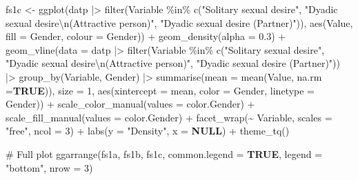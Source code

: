 \documentclass[
  bookmarksnumbered]{article}
\newenvironment{Shaded}{\begin{snugshade}}{\end{snugshade}}
\newcommand{\AttributeTok}[1]{\textcolor[rgb]{0.80,0.80,0.80}{#1}}
\newcommand{\CommentTok}[1]{\textcolor[rgb]{0.50,0.62,0.50}{#1}}
\newcommand{\ConstantTok}[1]{\textcolor[rgb]{0.86,0.64,0.64}{\textbf{#1}}}
\newcommand{\DecValTok}[1]{\textcolor[rgb]{0.86,0.86,0.80}{#1}}
\newcommand{\FloatTok}[1]{\textcolor[rgb]{0.75,0.75,0.82}{#1}}
\newcommand{\FunctionTok}[1]{\textcolor[rgb]{0.94,0.94,0.56}{#1}}
\newcommand{\NormalTok}[1]{\textcolor[rgb]{0.80,0.80,0.80}{#1}}
\newcommand{\OtherTok}[1]{\textcolor[rgb]{0.94,0.94,0.56}{#1}}
\newcommand{\SpecialCharTok}[1]{\textcolor[rgb]{0.86,0.64,0.64}{#1}}
\newcommand{\StringTok}[1]{\textcolor[rgb]{0.80,0.58,0.58}{#1}}
\begin{document}
\begin{Shaded}
\begin{Highlighting}[]
\NormalTok{fs1c }\OtherTok{\textless{}{-}} \FunctionTok{ggplot}\NormalTok{(datp }\SpecialCharTok{|\textgreater{}}
                 \FunctionTok{filter}\NormalTok{(Variable }\SpecialCharTok{\%in\%} \FunctionTok{c}\NormalTok{(}\StringTok{"Solitary sexual desire"}\NormalTok{,}
                                        \StringTok{"Dyadic sexual desire}\SpecialCharTok{\textbackslash{}n}\StringTok{(Attractive person)"}\NormalTok{,}
                                        \StringTok{"Dyadic sexual desire (Partner)"}\NormalTok{)),}
             \FunctionTok{aes}\NormalTok{(Value,}
                 \AttributeTok{fill =}\NormalTok{ Gender,}
                 \AttributeTok{colour =}\NormalTok{ Gender)) }\SpecialCharTok{+}
        \FunctionTok{geom\_density}\NormalTok{(}\AttributeTok{alpha =} \FloatTok{0.3}\NormalTok{) }\SpecialCharTok{+}
        \FunctionTok{geom\_vline}\NormalTok{(}\AttributeTok{data =}\NormalTok{ datp }\SpecialCharTok{|\textgreater{}}
                     \FunctionTok{filter}\NormalTok{(Variable }\SpecialCharTok{\%in\%} \FunctionTok{c}\NormalTok{(}\StringTok{"Solitary sexual desire"}\NormalTok{,}
                                            \StringTok{"Dyadic sexual desire}\SpecialCharTok{\textbackslash{}n}\StringTok{(Attractive person)"}\NormalTok{,}
                                            \StringTok{"Dyadic sexual desire (Partner)"}\NormalTok{)) }\SpecialCharTok{|\textgreater{}} 
                     \FunctionTok{group\_by}\NormalTok{(Variable, Gender) }\SpecialCharTok{|\textgreater{}}
                     \FunctionTok{summarise}\NormalTok{(}\AttributeTok{mean =} \FunctionTok{mean}\NormalTok{(Value, }\AttributeTok{na.rm =}\ConstantTok{TRUE}\NormalTok{)),}
                   \AttributeTok{size =} \DecValTok{1}\NormalTok{,}
                   \FunctionTok{aes}\NormalTok{(}\AttributeTok{xintercept =}\NormalTok{ mean, }\AttributeTok{color =}\NormalTok{ Gender, }\AttributeTok{linetype =}\NormalTok{ Gender)) }\SpecialCharTok{+}
        \FunctionTok{scale\_color\_manual}\NormalTok{(}\AttributeTok{values =}\NormalTok{ color.Gender) }\SpecialCharTok{+}
        \FunctionTok{scale\_fill\_manual}\NormalTok{(}\AttributeTok{values =}\NormalTok{ color.Gender) }\SpecialCharTok{+}
        \FunctionTok{facet\_wrap}\NormalTok{(}\SpecialCharTok{\textasciitilde{}}\NormalTok{ Variable,}
                   \AttributeTok{scales =} \StringTok{"free"}\NormalTok{,}
                   \AttributeTok{ncol =} \DecValTok{3}\NormalTok{) }\SpecialCharTok{+}
        \FunctionTok{labs}\NormalTok{(}\AttributeTok{y =} \StringTok{"Density"}\NormalTok{,}
             \AttributeTok{x =} \ConstantTok{NULL}\NormalTok{) }\SpecialCharTok{+}
        \FunctionTok{theme\_tq}\NormalTok{()}

\CommentTok{\# Full plot}
\FunctionTok{ggarrange}\NormalTok{(fs1a, fs1b, fs1c,}
          \AttributeTok{common.legend =} \ConstantTok{TRUE}\NormalTok{,}
          \AttributeTok{legend =} \StringTok{"bottom"}\NormalTok{,}
          \AttributeTok{nrow =} \DecValTok{3}\NormalTok{)}
\end{Highlighting}
\end{Shaded}
\end{document}
